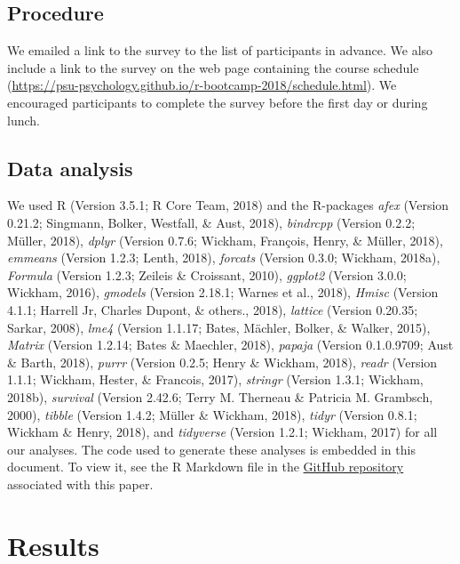 \documentclass[english,man]{apa6}
\theoremstyle{definition}
\theoremstyle{definition}
\theoremstyle{definition}
\theoremstyle{remark}
\begin{document}
\subsection{Procedure}\label{procedure}

We emailed a link to the survey to the list of participants in advance.
We also include a link to the survey on the web page containing the
course schedule
(\url{https://psu-psychology.github.io/r-bootcamp-2018/schedule.html}).
We encouraged participants to complete the survey before the first day
or during lunch.

\subsection{Data analysis}\label{data-analysis}

We used R (Version 3.5.1; R Core Team, 2018) and the R-packages
\emph{afex} (Version 0.21.2; Singmann, Bolker, Westfall, \& Aust, 2018),
\emph{bindrcpp} (Version 0.2.2; Müller, 2018), \emph{dplyr} (Version
0.7.6; Wickham, François, Henry, \& Müller, 2018), \emph{emmeans}
(Version 1.2.3; Lenth, 2018), \emph{forcats} (Version 0.3.0; Wickham,
2018a), \emph{Formula} (Version 1.2.3; Zeileis \& Croissant, 2010),
\emph{ggplot2} (Version 3.0.0; Wickham, 2016), \emph{gmodels} (Version
2.18.1; Warnes et al., 2018), \emph{Hmisc} (Version 4.1.1; Harrell Jr,
Charles Dupont, \& others., 2018), \emph{lattice} (Version 0.20.35;
Sarkar, 2008), \emph{lme4} (Version 1.1.17; Bates, Mächler, Bolker, \&
Walker, 2015), \emph{Matrix} (Version 1.2.14; Bates \& Maechler, 2018),
\emph{papaja} (Version 0.1.0.9709; Aust \& Barth, 2018), \emph{purrr}
(Version 0.2.5; Henry \& Wickham, 2018), \emph{readr} (Version 1.1.1;
Wickham, Hester, \& Francois, 2017), \emph{stringr} (Version 1.3.1;
Wickham, 2018b), \emph{survival} (Version 2.42.6; Terry M. Therneau \&
Patricia M. Grambsch, 2000), \emph{tibble} (Version 1.4.2; Müller \&
Wickham, 2018), \emph{tidyr} (Version 0.8.1; Wickham \& Henry, 2018),
and \emph{tidyverse} (Version 1.2.1; Wickham, 2017) for all our
analyses. The code used to generate these analyses is embedded in this
document. To view it, see the R Markdown file in the
\href{http://github.com/psu-psychology/r-bootcamp-2018/talks}{GitHub
repository} associated with this paper.

\section{Results}\label{results}
\end{document}
